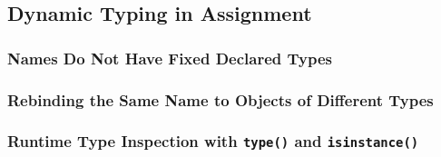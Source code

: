 \subsection{Dynamic Typing in Assignment}
\subsubsection{Names Do Not Have Fixed Declared Types}
\subsubsection{Rebinding the Same Name to Objects of Different Types}
\subsubsection{Runtime Type Inspection with \texttt{type()} and \texttt{isinstance()}}
